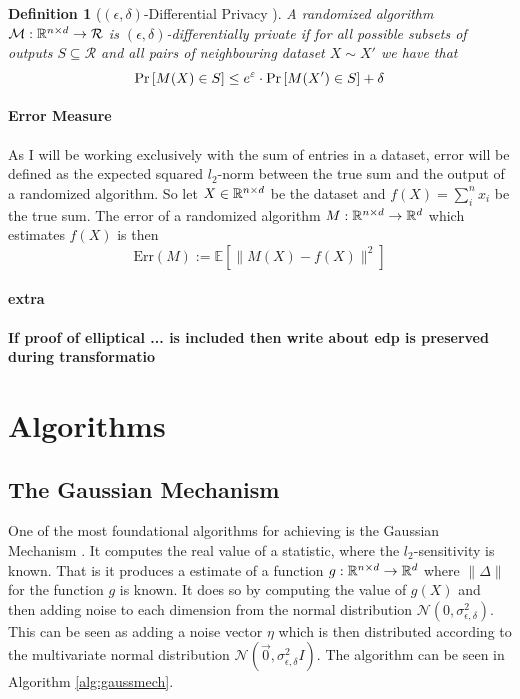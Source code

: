 \documentclass[a4paper,12pt]{article}
\newtheorem{definition}{Definition}[section]
\begin{document}
\vspace*{0.3cm}
\begin{definition}[$(\epsilon, \delta)$-Differential Privacy \cite{dwork2016}]
A randomized algorithm $\mathcal{M}: \mathbb{R}^{n \times d} \rightarrow \mathcal{R}$ 
is $(\epsilon, \delta)$-differentially private if for all possible 
subsets of outputs $S \subseteq \mathcal{R}$ and all pairs of 
neighbouring dataset $X \sim X'$ we have that
\[ \textnormal{Pr}\left [M(X) \in S \right] \le e^{\varepsilon} \cdot \textnormal{Pr}\left [M(X') \in S \right] + \delta \]

    
\end{definition}

\paragraph{Error Measure}
As I will be working exclusively with the sum of entries 
in a dataset, error will be defined as the expected
squared $l_2$-norm between the true sum and 
the output of a randomized algorithm.
So let $X \in \mathbb{R}^{n \times d}$ be the dataset and
$f(X) = \sum_i^n x_i$ be the true sum. The error of a
randomized algorithm $M : \mathbb{R}^{n \times d} \rightarrow \mathbb{R}^d$
which estimates $f(X)$ is then 
\[
    \text{Err}(M) := \mathbb{E} \left[ \| M(X) - f(X) \|^2 \right]
\]

\paragraph{extra}
\textbf{If proof of elliptical ... is included then 
write about edp is preserved during transformatio}


\section{Algorithms}
\subsection{The Gaussian Mechanism}
One of the most foundational algorithms for achieving 
\edp is the Gaussian Mechanism \cite{dpbasic}. It computes the real
value of a statistic, where the $l_2$-sensitivity is known.
That is it produces a \edp estimate of a function 
$g: \mathbb{R}^{n \times d} \rightarrow \mathbb{R}^{d}$ where $ \| \Delta \|$ 
for the function $g$ is known.
It does so by computing the value of $g(X)$ and then adding noise
to each dimension from the normal distribution 
$\mathcal{N}(0, \sigma_{\epsilon,\delta}^2)$.
This can be seen as adding a noise vector $\eta$ which 
is then distributed according to
the multivariate normal distribution 
$\mathcal{N}(\overrightarrow{0}, \sigma_{\epsilon,\delta}^2I)$. 
The algorithm can be seen in Algorithm \ref{alg:gaussmech}.
\end{document}
